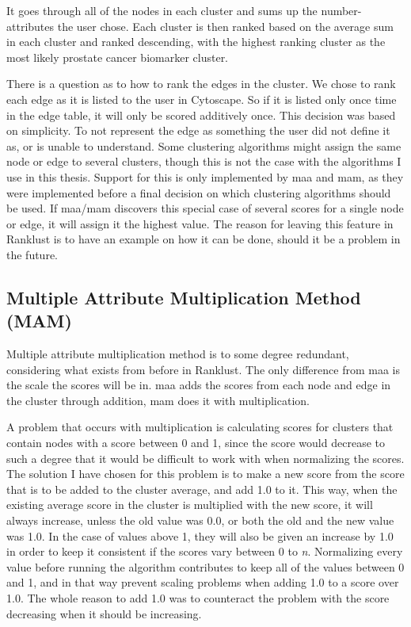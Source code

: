 It goes through all of the nodes in each cluster and sums up the number-
attributes the user chose. Each cluster is then ranked based on the average sum
in each cluster and ranked descending, with the highest ranking cluster as the
most likely prostate cancer biomarker cluster.

There is a question as to how to rank the edges in the cluster. We chose to rank
each edge as it is listed to the user in Cytoscape. So if it is listed only once
time in the edge table, it will only be scored additively once. This decision
was based on simplicity. To not represent the edge as something the user did not
define it as, or is unable to understand. Some clustering algorithms might
assign the same node or edge to several clusters, though this is not the case
with the algorithms I use in this thesis. Support for this is only implemented
by \gls{maa} and \gls{mam}, as they were implemented before a final decision on
which clustering algorithms should be used. If \gls{maa}/\gls{mam} discovers
this special case of several scores for a single node or edge, it will assign it
the highest value.  The reason for leaving this feature in Ranklust is to have
an example on how it can be done, should it be a problem in the future.

\subsection{Multiple Attribute Multiplication Method (MAM)} Multiple attribute
multiplication method is to some degree redundant, considering what exists from
before in Ranklust. The only difference from \gls{maa} is the scale the scores
will be in. \gls{maa} adds the scores from each node and edge in the cluster
through addition, \gls{mam} does it with multiplication.

A problem that occurs with multiplication is calculating scores for clusters
that contain nodes with a score between 0 and 1, since the score would decrease
to such a degree that it would be difficult to work with when normalizing the
scores. The solution I have chosen for this problem is to make a new score from
the score that is to be added to the cluster average, and add 1.0 to it. This
way, when the existing average score in the cluster is multiplied with the new
score, it will always increase, unless the old value was 0.0, or both the old
and the new value was 1.0. In the case of values above 1, they will also be
given an increase by 1.0 in order to keep it consistent if the scores vary
between 0 to \textit{n}. Normalizing every value before running the algorithm
contributes to keep all of the values between 0 and 1, and in that way prevent
scaling problems when adding 1.0 to a score over 1.0. The whole reason to add
1.0 was to counteract the problem with the score decreasing when it should be
increasing.

